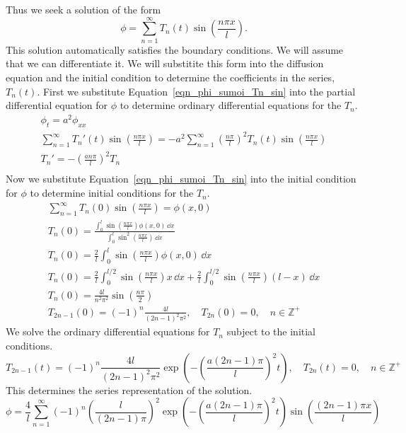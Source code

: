 {\begin{Solution}
  Thus we seek a solution of the form
  \begin{equation}
    \label{eqn_phi_sumoi_Tn_sin}
    \phi = \sum_{n=1}^\infty T_n(t) \sin \left( \frac{n \pi x}{l} \right).
  \end{equation}
  This solution automatically satisfies the boundary conditions.  We will 
  assume that we can differentiate it.  We will substitite this form into
  the diffusion equation and the initial condition to determine the 
  coefficients in the series, $T_n(t)$.
  First we substitute Equation~\ref{eqn_phi_sumoi_Tn_sin}
  into the partial differential equation for
  $\phi$ to determine ordinary differential equations for the $T_n$.
  \begin{gather*}
    \phi_t = a^2 \phi_{x x} \\
    \sum_{n=1}^\infty T_n'(t) \sin \left( \frac{n \pi x}{l} \right)
    = - a^2 \sum_{n=1}^\infty \left( \frac{n \pi}{l} \right)^2 T_n(t) 
    \sin \left( \frac{n \pi x}{l} \right) \\
    T_n' = - \left( \frac{a n \pi}{l} \right)^2 T_n \\
  \end{gather*}
  Now we substitute Equation~\ref{eqn_phi_sumoi_Tn_sin}
  into the initial condition for $\phi$ to determine 
  initial conditions for the $T_n$.
  \begin{gather*}
    \sum_{n=1}^\infty T_n(0) \sin \left( \frac{n \pi x}{l} \right) = \phi(x, 0) \\
    T_n(0) = \frac{ \int_0^l \sin\left(\frac{ n \pi x}{l}\right) \phi(x, 0) \,\dd x }
    { \int_0^l \sin^2 \left(\frac{ n \pi x}{l}\right) \,\dd x } \\
    T_n(0) = \frac{2}{l} \int_0^l \sin\left(\frac{ n \pi x}{l}\right) 
    \phi(x, 0) \,\dd x \\
    T_n(0) = \frac{2}{l} \int_0^{l/2} \sin\left(\frac{ n \pi x}{l}\right) x \,\dd x
    + \frac{2}{l} \int_0^{l/2} \sin\left(\frac{ n \pi x}{l}\right)
    (l-x) \,\dd x \\
    T_n(0) = \frac{4 l}{n^2 \pi^2} \sin \left( \frac{n \pi}{2} \right) \\
    T_{2n-1}(0) = (-1)^n \frac{4 l}{(2n-1)^2 \pi^2}, \quad
    T_{2n}(0) = 0, \quad n \in \mathbb{Z}^+
  \end{gather*}
  We solve the ordinary differential equations for $T_n$ subject to the 
  initial conditions.
  \[
  T_{2n-1}(t) = (-1)^n \frac{4 l}{(2n-1)^2 \pi^2} 
  \exp \left( - \left( \frac{a (2n-1) \pi}{l} \right)^2 t \right), \quad
  T_{2n}(t) = 0, \quad n \in \mathbb{Z}^+
  \]
  This determines the series representation of the solution.
  \[
  \boxed{
    \phi = \frac{4}{l}\sum_{n=1}^\infty (-1)^n \left( \frac{l}{(2n-1) \pi} \right)^2
    \exp \left( - \left( \frac{a (2n-1) \pi}{l} \right)^2 t \right)
    \sin \left( \frac{(2n-1) \pi x}{l} \right)
    }
  \]


\end{Solution}}
